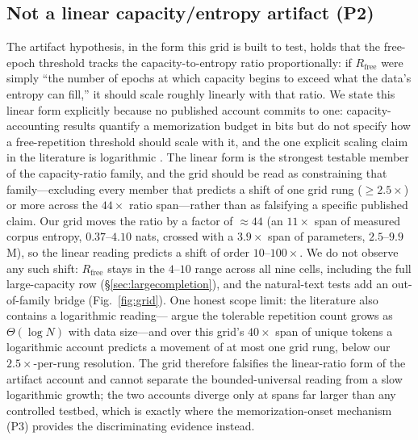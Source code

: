 \documentclass[11pt]{article}
\begin{document}
\subsection{Not a linear capacity/entropy artifact (P2)}\label{sec:p2}

The artifact hypothesis, in the form this grid is built to test, holds that the
free-epoch threshold tracks the capacity-to-entropy ratio proportionally: if
$R_{\mathrm{free}}$ were simply ``the number of epochs at which capacity begins to exceed
what the data's entropy can fill,'' it should scale roughly linearly with that ratio. We
state this linear form explicitly because no published account commits to one:
capacity-accounting results \citep{morris2025capacity} quantify a memorization budget in
bits but do not specify how a free-repetition threshold should scale with it, and the one
explicit scaling claim in the literature is logarithmic \citep{yan2025repeatmore}. The
linear form is the strongest testable member of the capacity-ratio family, and the grid
should be read as constraining that family---excluding every member that predicts a
shift of one grid rung (${\geq}2.5\times$) or more across the $44\times$ ratio
span---rather than as falsifying a specific published claim. Our
grid moves the ratio by a factor of ${\approx}44$ (an $11\times$ span of measured corpus
entropy, $0.37$--$4.10$ nats, crossed with a $3.9\times$ span of parameters,
$2.5$--$9.9$M), so the linear reading predicts a shift of order $10$--$100\times$. We do
not observe any such shift: $R_{\mathrm{free}}$ stays in the $4$--$10$ range across all
nine cells, including the full large-capacity row (\S\ref{sec:largecompletion}), and the
natural-text tests add an out-of-family bridge (Fig.~\ref{fig:grid}). One honest scope
limit: the literature also contains a logarithmic reading---\citet{yan2025repeatmore}
argue the tolerable repetition count grows as $\Theta(\log N)$ with data size---and over
this grid's $40\times$ span of unique tokens a logarithmic account predicts a movement of
at most one grid rung, below our $2.5\times$-per-rung resolution. The grid therefore
falsifies the linear-ratio form of the artifact account and cannot separate the
bounded-universal reading from a slow logarithmic growth; the two accounts diverge only
at spans far larger than any controlled testbed, which is exactly where the
memorization-onset mechanism (P3) provides the discriminating evidence instead.
\end{document}
